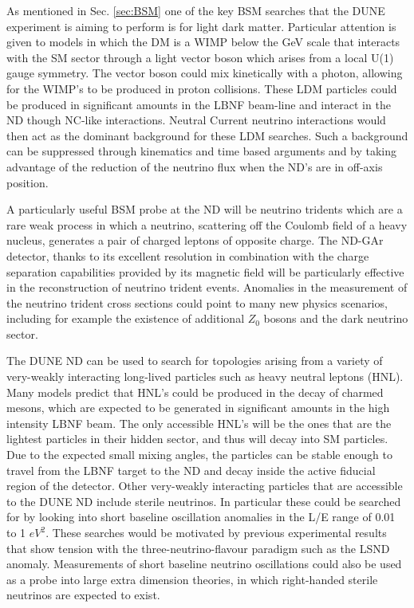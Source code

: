 As mentioned in Sec. \ref{sec:BSM} one of the key BSM searches that the DUNE experiment is aiming to perform is for light dark matter. Particular attention is given to models in which the DM is a WIMP below the GeV scale that interacts with the SM sector through a light vector boson which arises from a local U(1) gauge symmetry. The vector boson could mix kinetically with a photon, allowing for the WIMP's to be produced in proton collisions. These LDM particles could be produced in significant amounts in the LBNF beam-line and interact in the ND though NC-like interactions. Neutral Current neutrino interactions would then act as the dominant background for these LDM searches. Such a background can be suppressed through kinematics and time based arguments and by taking advantage of the reduction of the neutrino flux when the ND's are in off-axis position.

A particularly useful BSM probe at the ND will be neutrino tridents which are a rare weak process in which a neutrino, scattering off the Coulomb field of a heavy nucleus, generates a pair of charged leptons of opposite charge. The ND-GAr detector, thanks to its excellent resolution in combination with the charge separation capabilities provided by its magnetic field will be particularly effective in the reconstruction of neutrino trident events. Anomalies in the measurement of the neutrino trident cross sections could point to many new physics scenarios, including for example the existence of additional $Z_0$ bosons and the dark neutrino sector. 

The DUNE ND can be used to search for topologies arising from a variety of very-weakly interacting long-lived particles such as heavy neutral leptons (HNL). Many models predict that HNL's could be produced in the decay of charmed mesons, which are expected to be generated in significant amounts in the high intensity LBNF beam. The only accessible HNL's  will be the ones that are the lightest particles in their hidden sector, and thus will decay into SM particles. Due to the expected small mixing angles, the particles can be stable enough to travel from the LBNF target to the ND and decay inside the active fiducial region of the detector. Other very-weakly interacting particles that are accessible to the DUNE ND include sterile neutrinos. In particular these could be searched for by looking into short baseline oscillation anomalies in the L/E range of 0.01 to 1 $eV^2$. These searches would be motivated by previous experimental results that show tension with the three-neutrino-flavour paradigm such as the LSND anomaly. Measurements of short baseline neutrino oscillations could also be used as a probe into large extra dimension theories, in which right-handed sterile neutrinos are expected to exist.

